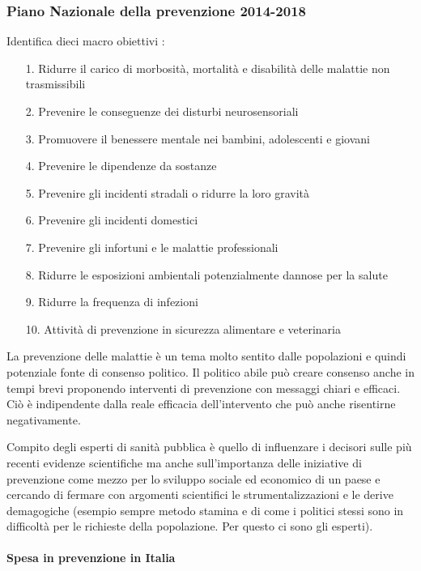 \subsubsection{Piano Nazionale della prevenzione 2014-2018}

Identifica dieci macro obiettivi :

\begin{itemize}
\item[1.]
  Ridurre il carico di morbosità, mortalità e disabilità delle malattie
  non trasmissibili
\item[2.]
  Prevenire le conseguenze dei disturbi neurosensoriali
\item[3.]
  Promuovere il benessere mentale nei bambini, adolescenti e giovani
\item[4.]
  Prevenire le dipendenze da sostanze
\item[5.]
  Prevenire gli incidenti stradali o ridurre la loro gravità
\item[6.]
  Prevenire gli incidenti domestici
\item[7.]
  Prevenire gli infortuni e le malattie professionali
\item[8.]
  Ridurre le esposizioni ambientali potenzialmente dannose per la salute
\item[9.]
  Ridurre la frequenza di infezioni
\item[10.]
  Attività di prevenzione in sicurezza alimentare e veterinaria
\end{itemize}

La prevenzione delle malattie è un tema molto sentito dalle popolazioni
e quindi potenziale fonte di consenso politico. Il politico abile può
creare consenso anche in tempi brevi proponendo interventi di
prevenzione con messaggi chiari e efficaci. Ciò è indipendente dalla
reale efficacia dell'intervento che può anche risentirne negativamente.

Compito degli esperti di sanità pubblica è quello di influenzare i
decisori sulle più recenti evidenze scientifiche ma anche
sull'importanza delle iniziative di prevenzione come mezzo per lo
sviluppo sociale ed economico di un paese e cercando di fermare con
argomenti scientifici le strumentalizzazioni e le derive demagogiche
(esempio sempre metodo stamina e di come i politici stessi sono in
difficoltà per le richieste della popolazione. Per questo ci sono gli
esperti).

\paragraph{Spesa in prevenzione in Italia}

